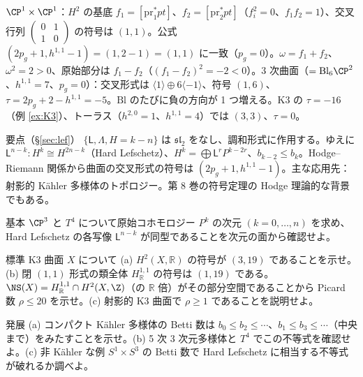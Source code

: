\begin{ex}\label{ex:sigcheck}
$\CP^1\times\CP^1$：$H^2$ の基底 $f_1=[\mathrm{pr}_1^*pt]$、$f_2=[\mathrm{pr}_2^*pt]$（$f_i^2=0$、$f_1f_2=1$）、交叉行列 $\begin{pmatrix}0&1\\1&0\end{pmatrix}$ の符号は $(1,1)$。公式 $(2p_g+1,h^{1,1}-1)=(1,2-1)=(1,1)$ に一致（$p_g=0$）。$\omega=f_1+f_2$、$\omega^2=2>0$、原始部分は $f_1-f_2$（$(f_1-f_2)^2=-2<0$）。3 次曲面（$=\mathrm{Bl}_6\CP^2$、$h^{1,1}=7$、$p_g=0$）：交叉形式は $\langle1\rangle\oplus6\langle-1\rangle$、符号 $(1,6)$、$\tau=2p_g+2-h^{1,1}=-5$。$\mathrm{Bl}$ のたびに負の方向が 1 つ増える。K3 の $\tau=-16$（例 \ref{ex:K3}）、トーラス（$h^{2,0}=1$、$h^{1,1}=4$）では $(3,3)$、$\tau=0$。
\end{ex}
\begin{keybox}{要点（\S\ref{sec:lef}）}
$\{\mathsf L,\Lambda,H=k-n\}$ は $\mathfrak{sl}_2$ をなし、調和形式に作用する。ゆえに $\mathsf L^{n-k}:H^k\cong H^{2n-k}$（Hard Lefschetz）、$H^k=\bigoplus\mathsf L^rP^{k-2r}$、$b_{k-2}\le b_k$。Hodge--Riemann 関係から曲面の交叉形式の符号は $(2p_g+1,h^{1,1}-1)$。主な応用先：射影的 Kähler 多様体のトポロジー。第 8 巻の符号定理の Hodge 理論的な背景でもある。
\end{keybox}

\begin{prob}{基本}\label{p:primP3}
$\CP^3$ と $T^4$ について原始コホモロジー $P^k$ の次元 $(k=0,\dots,n)$ を求め、Hard Lefschetz の各写像 $\mathsf L^{n-k}$ が同型であることを次元の面から確認せよ。
\end{prob}
\begin{prob}{標準}\label{p:hodgeindex}
K3 曲面 $X$ について (a) $H^2(X,\mathbb R)$ の符号が $(3,19)$ であることを示せ。(b) 閉 $(1,1)$ 形式の類全体 $H^{1,1}_{\mathbb R}$ の符号は $(1,19)$ である。$\NS(X)=H^{1,1}_{\mathbb R}\cap H^2(X,\Z)$（の $\mathbb R$ 倍）がその部分空間であることから Picard 数 $\rho\le20$ を示せ。(c) 射影的 K3 曲面で $\rho\ge1$ であることを説明せよ。
\end{prob}
\begin{prob}{発展}\label{p:unimodal}
(a) コンパクト Kähler 多様体の Betti 数は $b_0\le b_2\le\cdots$、$b_1\le b_3\le\cdots$（中央まで）をみたすことを示せ。(b) 5 次 3 次元多様体と $T^4$ でこの不等式を確認せよ。(c) 非 Kähler な例 $S^1\times S^3$ の Betti 数で Hard Lefschetz に相当する不等式が破れるか調べよ。
\end{prob}

